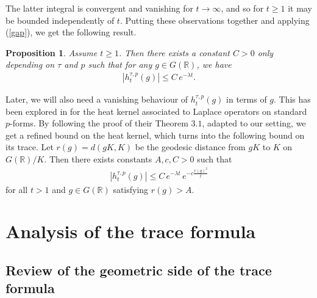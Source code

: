 \documentclass[11pt,reqno]{amsart}
\numberwithin{equation}{section}
\newtheorem{prop}[thm]{Proposition}
\theoremstyle{definition}
\theoremstyle{remark}
\newcommand{\R}{\mathbb{R}}
\begin{document}
The latter integral is convergent and vanishing for $t\to\infty$, and so for $t\geq 1$ it may be bounded independently of $t$. Putting these observations together and applying (\ref{gap}), we get the following result.
\begin{prop}\label{traceheatdecay}
    Assume $t\geq 1$. Then there exists a constant $C>0$ only depending on $\tau$ and $p$ such that for any $g\in G(\R)$, we have
    \begin{align*}
        | h_t^{\tau,p}(g)|\leq C\,e^{-\lambda t}.
    \end{align*}
\end{prop}

\noindent Later, we will also need a vanishing behaviour of $h_t^{\tau,p}(g)$ in terms of $g$. This has been explored in \cite{LéM} for the heat kernel associated to Laplace operators on standard $p$-forms. By following the proof of their Theorem $3.1$, adapted to our setting, we get a refined bound on the heat kernel, which turns into the following bound on its trace. Let $r(g)=d(gK,K)$ be the geodesic distance from $gK$ to $K$ on $G(\R)/K$. Then there exists constants $A,c,C>0$ such that
\begin{align}\label{vanishin|g|}
    |h_t^{\tau,p}(g)|\leq C\, e^{-\lambda t}\, e^{-c\frac{r(g)^2}{t}}
\end{align}
for all $t>1$ and $g\in G(\R)$ satisfying $r(g) > A$.


\bigskip

\section{Analysis of the trace formula}\label{trace formula}

\subsection*{Review of the geometric side of the trace formula}\label{tracereview}
\end{document}
